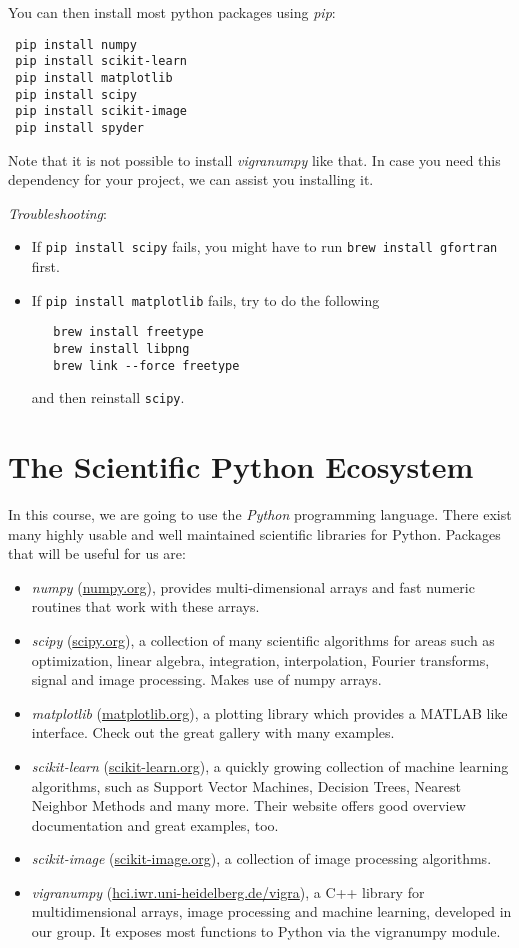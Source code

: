 \documentclass{../uebungsblatt}
\begin{document}
You can then install most python packages using \emph{pip}:
\begin{lstlisting}
 pip install numpy
 pip install scikit-learn
 pip install matplotlib
 pip install scipy
 pip install scikit-image
 pip install spyder
\end{lstlisting}

Note that it is not possible to install \emph{vigranumpy} like that. In case you need this dependency for your project, we can assist you installing it.

\emph{Troubleshooting}:
\begin{itemize}
 \item If \lstinline!pip install scipy! fails, you might have to run \lstinline!brew install gfortran! first.
 \item If \lstinline!pip install matplotlib! fails, try to do the following
  \begin{lstlisting}
   brew install freetype
   brew install libpng
   brew link --force freetype
  \end{lstlisting}
  and then reinstall \lstinline!scipy!.
\end{itemize}



\section*{The Scientific Python Ecosystem}

In this course, we are going to use the \emph{Python} programming language.
There exist many highly usable and well maintained scientific libraries for
Python. Packages that will be useful for us are:
\begin{itemize}
\item\emph{numpy} (\url{numpy.org}), provides multi-dimensional arrays
and fast numeric routines that work with these arrays.
%
\item\emph{scipy} (\url{scipy.org}), a collection of many scientific algorithms for areas such as optimization, linear algebra, integration, interpolation,
Fourier transforms, signal and image processing. Makes use of numpy arrays.
%
\item\emph{matplotlib} (\url{matplotlib.org}), a plotting library which provides
a MATLAB like interface. Check out the great gallery with many examples.
%
\item\emph{scikit-learn} (\url{scikit-learn.org}), a quickly growing collection
of machine learning algorithms, such as Support Vector Machines, Decision Trees,
Nearest Neighbor Methods and many more. Their website offers good overview
documentation and great examples, too.
%
\item\emph{scikit-image} (\url{scikit-image.org}), a collection of image
processing algorithms.
%
\item\emph{vigranumpy} (\url{hci.iwr.uni-heidelberg.de/vigra}), a
C++ library for multidimensional arrays, image processing and machine learning,
developed in our group. It exposes most functions to Python via the 
vigranumpy module.
\end{itemize}
\end{document}
